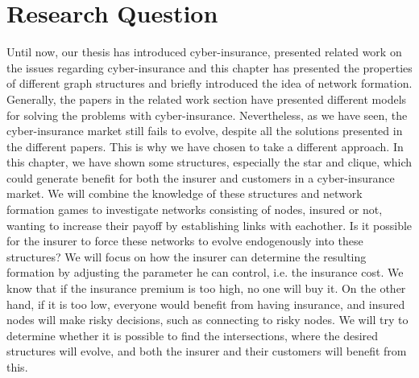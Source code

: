 \section{Research Question}
Until now, our thesis has introduced cyber-insurance, presented related work on the issues regarding cyber-insurance and this chapter has presented the properties of different graph structures and briefly introduced the idea of network formation. Generally, the papers in the related work section have presented different models for solving the problems with cyber-insurance. Nevertheless, as we have seen, the cyber-insurance market still fails to evolve, despite all the solutions presented in the different papers. This is why we have chosen to take a different approach.
In this chapter, we have shown some structures, especially the star and clique, which could generate benefit for both the insurer and customers in a cyber-insurance market. 
We will combine the knowledge of these structures and network formation games to investigate networks consisting of nodes, insured or not, wanting to increase their payoff by establishing links with eachother. Is it possible for the insurer to force these networks to evolve endogenously into these structures?
We will focus on how the insurer can determine the resulting formation by adjusting the parameter he can control, i.e. the insurance cost. We know that if the insurance premium is too high, no one will buy it. On the other hand, if it is too low, everyone would benefit from having insurance, and insured nodes will make risky decisions, such as connecting to risky nodes. We will try to determine whether it is possible to find the intersections, where the desired structures will evolve, and both the insurer and their customers will benefit from this.


